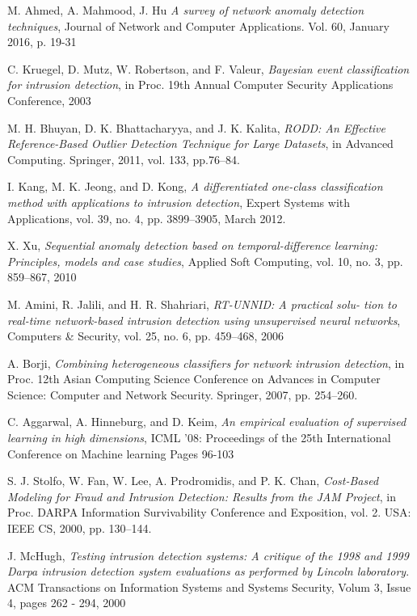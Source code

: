\documentclass[reqno,openany,12pt]{amsbook}
\begin{document}
\begin{thebibliography}{99}
 M. Ahmed, A. Mahmood, J. Hu \emph{A survey of network anomaly detection techniques}, Journal of Network and Computer Applications. Vol. 60, January 2016, p. 19-31

 C. Kruegel, D. Mutz, W. Robertson, and F. Valeur, \emph{Bayesian event classification for intrusion detection}, in Proc. 19th Annual Computer Security Applications Conference, 2003

 M. H. Bhuyan, D. K. Bhattacharyya, and J. K. Kalita, \emph{RODD: An Effective Reference-Based Outlier Detection Technique for Large Datasets}, in Advanced Computing. Springer, 2011, vol. 133, pp.76–84.

 I. Kang, M. K. Jeong, and D. Kong, \emph{A differentiated one-class classification method with applications to intrusion detection}, Expert Systems with Applications, vol. 39, no. 4, pp. 3899–3905, March 2012.

 X. Xu, \emph{Sequential anomaly detection based on temporal-difference
learning: Principles, models and case studies}, Applied Soft Computing, vol. 10, no. 3, pp. 859–867, 2010

 M. Amini, R. Jalili, and H. R. Shahriari, \emph{RT-UNNID: A practical solu-
tion to real-time network-based intrusion detection using unsupervised neural networks}, Computers \& Security, vol. 25, no. 6, pp. 459–468, 2006

 A. Borji, \emph{Combining heterogeneous classifiers for network intrusion
detection}, in Proc. 12th Asian Computing Science Conference on Advances in Computer Science: Computer and Network Security. Springer, 2007, pp. 254–260.

 C. Aggarwal, A. Hinneburg, and D. Keim, \emph{An empirical evaluation of supervised learning in high dimensions}, ICML '08: Proceedings of the 25th International Conference on Machine learning Pages 96-103

 S. J. Stolfo, W. Fan, W. Lee, A. Prodromidis, and P. K. Chan, \emph{Cost-Based Modeling for Fraud and Intrusion Detection: Results from the JAM Project}, in Proc. DARPA Information Survivability Conference and Exposition, vol. 2. USA: IEEE CS, 2000, pp. 130–144.

 J. McHugh, \emph{Testing intrusion detection systems: A critique of the 1998 and 1999 Darpa intrusion detection system evaluations as performed by Lincoln laboratory}. 
ACM Transactions on Information Systems and Systems Security, Volum 3, Issue 4, pages 262 - 294, 2000


\end{thebibliography}
\end{document}
